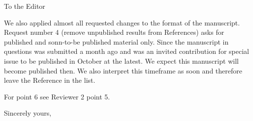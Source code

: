\documentclass[DIN,pagenumber=false,parskip=half,fromalign=left,fromphone=true,fromemail=true,fromurl=false,fromlogo=false,fromrule=false]{scrlttr2}
\begin{document}
\begin{letter}{To the Editor}
\begin{enumerate}
\end{enumerate}

We also applied almost all requested changes to the format of the manuscript.
Request number 4 (remove unpublished results from References) asks for
published and sonn-to-be published material only. Since the manuscript in
questions was submitted a month ago and was an invited contribution
for special issue to be published in October at the latest.
We expect this manuscript
will become published then. We also interpret this timeframe as soon
and therefore leave the Reference in the list.

For point 6 see Reviewer 2 point 5.



        \closing{Sincerely yours,}
	\end{letter}
\end{document}
